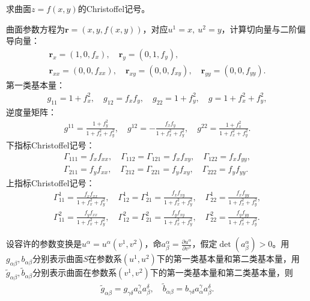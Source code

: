 \documentclass[../../main.tex]{subfiles}%
\begin{document}
\begin{example}
求曲面$z=f(x,y)$的Christoffel记号。
\end{example}
\begin{solution}
曲面参数方程为$\boldsymbol{r}=(x,y,f(x,y))$，对应$u^1=x,\ u^2=y$，计算切向量与二阶偏导向量：
\begin{align*}
\boldsymbol{r}_x=(1,0,f_x),\quad \boldsymbol{r}_y=(0,1,f_y),\\
\boldsymbol{r}_{xx}=(0,0,f_{xx}),\quad \boldsymbol{r}_{xy}=(0,0,f_{xy}),\quad \boldsymbol{r}_{yy}=(0,0,f_{yy}).
\end{align*}
第一类基本量：
\begin{align*}
g_{11}=1+f_x^2,\quad g_{12}=f_xf_y,\quad g_{22}=1+f_y^2,\quad g=1+f_x^2+f_y^2,
\end{align*}
逆度量矩阵：
\begin{align*}
g^{11}=\frac{1+f_y^2}{1+f_x^2+f_y^2},\quad g^{12}=-\frac{f_xf_y}{1+f_x^2+f_y^2},\quad g^{22}=\frac{1+f_x^2}{1+f_x^2+f_y^2}.
\end{align*}
下指标Christoffel记号：
\begin{align*}
\Gamma_{111}=f_xf_{xx},\quad \Gamma_{112}=\Gamma_{121}=f_xf_{xy},\quad \Gamma_{122}=f_xf_{yy},\\
\Gamma_{211}=f_yf_{xx},\quad \Gamma_{212}=\Gamma_{221}=f_yf_{xy},\quad \Gamma_{222}=f_yf_{yy}.
\end{align*}
上指标Christoffel记号：
\begin{align*}
\Gamma^1_{11}=\frac{f_xf_{xx}}{1+f_x^2+f_y^2},\quad \Gamma^1_{12}=\Gamma^1_{21}=\frac{f_xf_{xy}}{1+f_x^2+f_y^2},\quad \Gamma^1_{22}=\frac{f_xf_{yy}}{1+f_x^2+f_y^2},\\
\Gamma^2_{11}=\frac{f_yf_{xx}}{1+f_x^2+f_y^2},\quad \Gamma^2_{12}=\Gamma^2_{21}=\frac{f_yf_{xy}}{1+f_x^2+f_y^2},\quad \Gamma^2_{22}=\frac{f_yf_{yy}}{1+f_x^2+f_y^2}.
\end{align*}

\end{solution}

\begin{example}
设容许的参数变换是$u^\alpha = u^\alpha(v^1,v^2)$，命$a^\alpha_\beta = \frac{\partial u^\alpha}{\partial v^\beta}$，假定$\det(a^\alpha_\beta) > 0$。用$g_{\alpha\beta},b_{\alpha\beta}$分别表示曲面$S$在参数系$(u^1,u^2)$下的第一类基本量和第二类基本量，用$\tilde{g}_{\alpha\beta},\tilde{b}_{\alpha\beta}$分别表示曲面在参数系$(v^1,v^2)$下的第一类基本量和第二类基本量，则
\begin{align*}
\tilde{g}_{\alpha\beta} = g_{\gamma\delta}a^\gamma_\alpha a^\delta_\beta,\quad \tilde{b}_{\alpha\beta} = b_{\gamma\delta}a^\gamma_\alpha a^\delta_\beta.
\end{align*}

\end{example}
\end{document}

